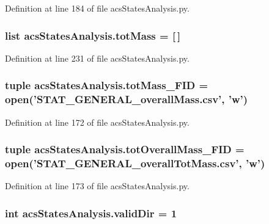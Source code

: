 Definition at line 184 of file acs\-States\-Analysis.\-py.

\hypertarget{a00099_ac2ecae6789d89cc56b0a731065837774}{
\subsubsection[{tot\-Mass}]{\setlength{\rightskip}{0pt plus 5cm}list acs\-States\-Analysis.\-tot\-Mass = \mbox{[}$\,$\mbox{]}}}\label{a00099_ac2ecae6789d89cc56b0a731065837774}


Definition at line 231 of file acs\-States\-Analysis.\-py.

\hypertarget{a00099_a1b7f5672822b59c7284cd2b703aacbc2}{
\subsubsection[{tot\-Mass\-\_\-\-F\-I\-D}]{\setlength{\rightskip}{0pt plus 5cm}tuple acs\-States\-Analysis.\-tot\-Mass\-\_\-\-F\-I\-D = open('S\-T\-A\-T\-\_\-\-G\-E\-N\-E\-R\-A\-L\-\_\-overall\-Mass.\-csv', 'w')}}\label{a00099_a1b7f5672822b59c7284cd2b703aacbc2}


Definition at line 172 of file acs\-States\-Analysis.\-py.

\hypertarget{a00099_a20a06acdb6e82bcaab87d2781d3555a9}{
\subsubsection[{tot\-Overall\-Mass\-\_\-\-F\-I\-D}]{\setlength{\rightskip}{0pt plus 5cm}tuple acs\-States\-Analysis.\-tot\-Overall\-Mass\-\_\-\-F\-I\-D = open('S\-T\-A\-T\-\_\-\-G\-E\-N\-E\-R\-A\-L\-\_\-overall\-Tot\-Mass.\-csv', 'w')}}\label{a00099_a20a06acdb6e82bcaab87d2781d3555a9}


Definition at line 173 of file acs\-States\-Analysis.\-py.

\hypertarget{a00099_aebb18ab2b73e7e2705ee42c728c0a72b}{
\subsubsection[{valid\-Dir}]{\setlength{\rightskip}{0pt plus 5cm}int acs\-States\-Analysis.\-valid\-Dir = 1}}\label{a00099_aebb18ab2b73e7e2705ee42c728c0a72b}


